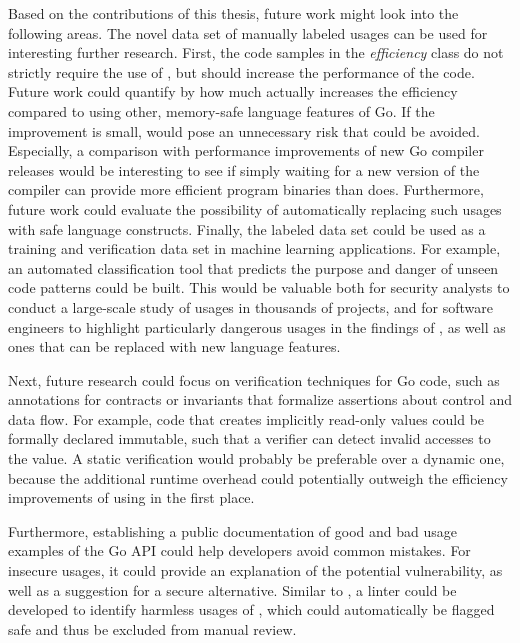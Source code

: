 Based on the contributions of this thesis, future work might look into the following areas.
The novel data set of manually labeled \unsafe{} usages can be used for interesting further research.
First, the code samples in the \textit{efficiency} class do not strictly require the use of \unsafe{}, but should increase the
performance of the code.
Future work could quantify by how much \unsafe{} actually increases the efficiency compared to using other, memory-safe
language features of Go.
If the improvement is small, \unsafe{} would pose an unnecessary risk that could be avoided.
Especially, a comparison with performance improvements of new Go compiler releases would be interesting to see if
simply waiting for a new version of the compiler can provide more efficient program binaries than \unsafe{} does.
Furthermore, future work could evaluate the possibility of automatically replacing such \unsafe{} usages with safe
language constructs.
Finally, the labeled data set could be used as a training and verification data set in machine learning applications.
For example, an automated classification tool that predicts the purpose and danger of unseen \unsafe{} code patterns
could be built.
This would be valuable both for security analysts to conduct a large-scale study of \unsafe{} usages in thousands of
projects, and for software engineers to highlight particularly dangerous usages in the findings of \toolGeiger{}, as
well as ones that can be replaced with new language features.

Next, future research could focus on verification techniques for \unsafe{} Go code, such as annotations for
contracts or invariants that formalize assertions about control and data flow.
For example, \unsafe{} code that creates implicitly read-only values could be formally declared immutable, such that
a verifier can detect invalid accesses to the value.
A static verification would probably be preferable over a dynamic one, because the additional runtime overhead could
potentially outweigh the efficiency improvements of using \unsafe{} in the first place.

Furthermore, establishing a public documentation of good and bad usage examples of the Go \unsafe{} \acrshort{API} could
help developers avoid common mistakes.
For insecure usages, it could provide an explanation of the potential vulnerability, as well as a suggestion for a
secure alternative.
Similar to \toolSafer{}, a linter could be developed to identify harmless usages of \unsafe{}, which could automatically
be flagged safe and thus be excluded from manual review.

